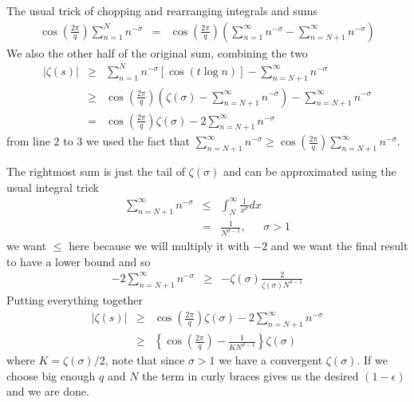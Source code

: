 \documentclass[aps,preprint,preprintnumbers,nofootinbib,showpacs,prd]{revtex4-1}
\newcommand{\nbea}{\begin{eqnarray*}}
\newcommand{\neea}{\end{eqnarray*}}
\begin{document}
The usual trick of chopping and rearranging integrals and sums
%
\nbea
\cos \left ( \tfrac{2\pi}{q} \right )\sum_{n=1}^N n^{-\sigma} & = & \cos \left ( \tfrac{2\pi}{q} \right ) \left ( \sum_{n=1}^\infty n^{-\sigma} - \sum_{n=N+1}^\infty n^{-\sigma} \right )
\neea
%
We also the other half of the original sum, combining the two
%
\nbea
|\zeta(s)| & \ge & \sum_{n=1}^N n^{-\sigma} [\cos (t\log n)]  - \sum_{n = N+1}^\infty n^{-\sigma} \\
& \ge & \cos \left ( \tfrac{2\pi}{q} \right ) \left ( \zeta(\sigma) - \sum_{n=N+1}^\infty n^{-\sigma} \right )  - \sum_{n = N+1}^\infty n^{-\sigma} \\
& = & \cos \left ( \tfrac{2\pi}{q} \right ) \zeta(\sigma) - 2 \sum_{n = N+1}^\infty n^{-\sigma}
\neea
%
from line 2 to 3 we used the fact that $\sum_{n=N+1}^\infty n^{-\sigma} \ge \cos \left ( \tfrac{2\pi}{q} \right )\sum_{n=N+1}^\infty n^{-\sigma}$.

The rightmost sum is just the tail of $\zeta(\sigma)$ and can be approximated using the usual integral trick
%
\nbea
\sum_{n=N+1}^\infty n^{-\sigma} & \le & \int_{N}^\infty \frac{1}{x^\sigma} dx \\
& = & \frac{1}{N^{\sigma - 1}}, ~~~~~~~ \sigma > 1
\neea
%
we want $\le$ here because we will multiply it with $-2$ and we want the final result to have a lower bound and so
%
\nbea
- 2 \sum_{n = N+1}^\infty n^{-\sigma} & \ge & - \zeta(\sigma) \frac{2}{\zeta(\sigma) N^{\sigma - 1}}
\neea
%
Putting everything together
%
\nbea
|\zeta(s)| & \ge & \cos \left ( \tfrac{2\pi}{q} \right ) \zeta(\sigma) - 2 \sum_{n = N+1}^\infty n^{-\sigma} \\
& \ge & \left \{ \cos \left ( \tfrac{2\pi}{q} \right ) - \frac{1}{K N^{\sigma - 1}} \right \} \zeta(\sigma)
\neea
%
where $K = \zeta(\sigma)/2$, note that since $\sigma > 1$ we have a convergent $\zeta(\sigma)$. If we choose big enough $q$ and $N$ the term in curly braces gives us the desired $(1 - \epsilon)$ and we are done.
\end{document}
